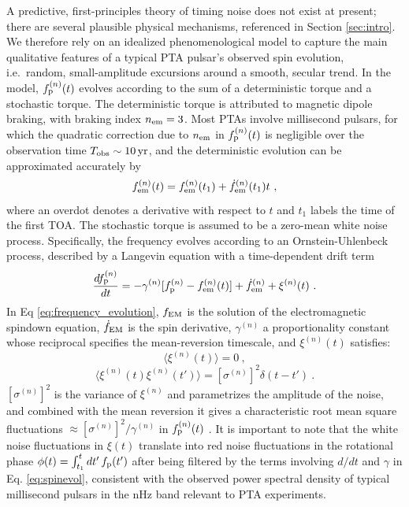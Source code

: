 \documentclass[fleqn,usenatbib,useAMS]{mnras}
\begin{document}
A predictive, first-principles theory of timing noise does not exist at present; there are several plausible physical mechanisms, referenced in Section \ref{sec:intro}. We therefore rely on an idealized phenomenological model to capture the main qualitative features of a typical PTA pulsar's observed spin evolution, i.e.\ random, small-amplitude excursions around a smooth, secular trend. In the model, $f_{\rm p}^{(n)}(t)$ evolves according to the sum of a deterministic torque and a stochastic torque. The deterministic torque is attributed to magnetic dipole braking, with braking index $n_{\rm em}=3$. Most PTAs involve millisecond pulsars, for which the quadratic correction due to $n_{\rm em}$ in $f_{\rm p}^{(n)}(t)$ is negligible over the observation time $T_{\rm obs} \sim 10 \, {\rm yr}$, and the deterministic evolution can be approximated accurately by 
\begin{equation}
 f_{\rm em}^{(n)}(t) = f_{\rm em}^{(n)}(t_1) + \dot{f}_{\rm em}^{(n)}(t_1)t \ , \label{eq:spinevol}
\end{equation} where an overdot denotes a derivative with respect to $t$ and $t_1$ labels the time of the first TOA. The stochastic torque is assumed to be a zero-mean white noise process. Specifically, the frequency evolves according to an Ornstein-Uhlenbeck process, described by a Langevin equation with a time-dependent drift term \citep{Vargas}
\begin{equation}
	\frac{df_{\rm p}^{(n)}}{dt} = -\gamma^{(n)}	 [f_{\rm p}^{(n)} - f_{\rm em}^{(n)} (t)] + \dot{f}_{\rm em}^{(n)} +\xi^{(n)}(t) \ . 
	\label{eq:frequency_evolution}
\end{equation}
In Eq \ref{eq:frequency_evolution}, $f_{\rm EM}$ is the solution of the electromagnetic spindown equation, $\dot{f}_{\rm EM}$ is the spin derivative, $\gamma^{(n)}$ a proportionality constant whose reciprocal specifies the mean-reversion timescale, and $\xi^{(n)}(t)$ satisfies:
\begin{equation}
	\langle \xi^{(n)}(t) \rangle = 0 \ ,
\end{equation}
\begin{equation}
	\langle \xi^{(n)}(t) \xi^{(n)}(t') \rangle = [\sigma^{(n)}]^2 \delta(t - t') \ .
	\label{eq:xieqn}
\end{equation}
$[\sigma^{(n)}]^2$ is the variance of $\xi^{(n)}$ and parametrizes the amplitude of the noise, and combined with the mean reversion it gives a characteristic root mean square fluctuations $\approx [\sigma^{(n)}]^2 / \gamma^{(n)}$ in $f_{\rm p}^{(n)}(t)$ \citep{gardiner2009stochastic}. It is important to note that the white noise fluctuations in $\xi(t)$ translate into red noise fluctuations in the rotational phase $\phi(t) = \int_{t_1}^t dt' \, f_{\rm p}(t')$ after being filtered by the terms involving $d/dt$ and $\gamma$ in Eq. \ref{eq:spinevol}, consistent with the observed power spectral density of typical millisecond pulsars in the nHz band relevant to PTA experiments. \newline 
\end{document}
